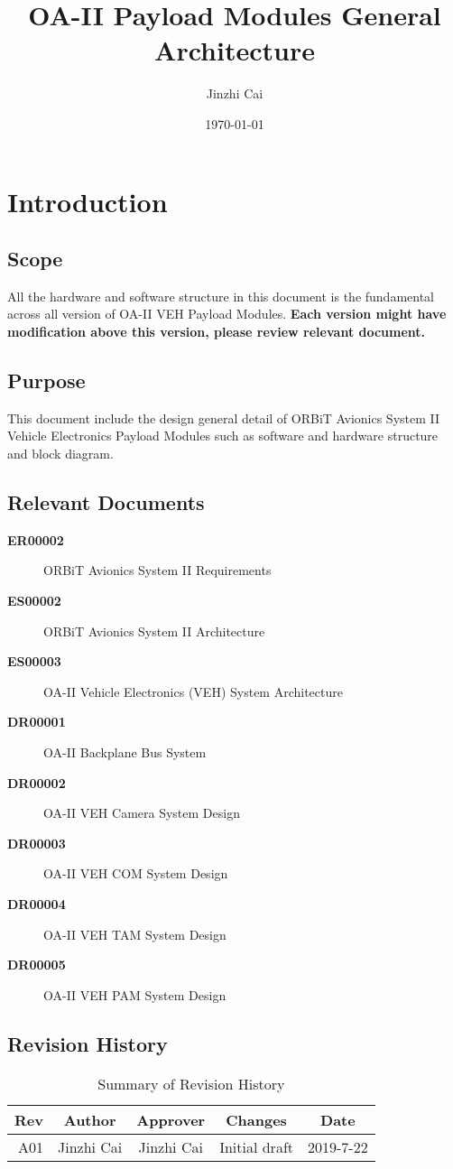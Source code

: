 \documentclass[12pt,article]{memoir}
\title{OA-II Payload Modules General Architecture}
\author{Jinzhi Cai}
\date{\today}
\begin{document}
	


\tableofcontents*
\clearpage


\chapter{Introduction}
\section{Scope}
All the hardware and software structure in this document is the fundamental across all version of OA-II VEH Payload Modules. \textbf{Each version might have modification above this version, please review relevant document.}
\section{Purpose}
This document include the design general detail of ORBiT Avionics System II Vehicle Electronics Payload Modules such as software and hardware structure and block diagram.
\section{Relevant Documents}
\begin{description}
	\item[\textbf{ER00002}]ORBiT Avionics System II Requirements
	\item[\textbf{ES00002}]ORBiT Avionics System II Architecture
	\item[\textbf{ES00003}]OA-II Vehicle Electronics (VEH) System Architecture
	\item[\textbf{DR00001}]OA-II Backplane Bus System
	\item[\textbf{DR00002}]OA-II VEH Camera System Design
	\item[\textbf{DR00003}]OA-II VEH COM System Design
	\item[\textbf{DR00004}]OA-II VEH TAM System Design
	\item[\textbf{DR00005}]OA-II VEH PAM System Design
\end{description}
\section{Revision History}
\begin{table}[H]
	\centering
	\begin{tabu}{r || c | c | c | c }
		Rev & Author & Approver & Changes & Date\\ \hline
		A01 & Jinzhi Cai & Jinzhi Cai & Initial draft & 2019-7-22 \\
	\end{tabu}
	\caption{Summary of Revision History}
	\label{tab:rev}
\end{table}
\newpage
\end{document}

